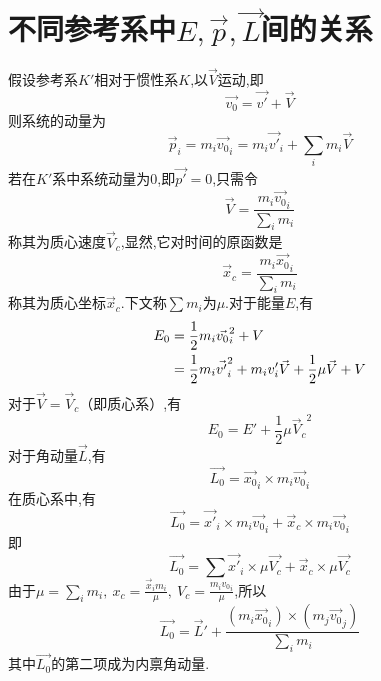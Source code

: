 \section{不同参考系中$E,\vec{p},\vec{L}$间的关系}
假设参考系$K'$相对于惯性系$K$,以$\vec{V}$运动,即
\begin{equation}
\vec{v_0} = \vec{v'} + \vec{V}
\end{equation}
则系统的动量为
\begin{equation}
\vec{p}_i = m_i \vec{v_0}_i = m_i\vec{v'}_i + \sum_{i}m_i\vec{V}
\end{equation}
若在$K'$系中系统动量为0,即$\vec{p'}=0$,只需令
\begin{equation}
\vec{V} = \frac{m_i\vec{v_0}_i}{\sum_{i}m_i}
\end{equation}
称其为质心速度$\vec{V}_c$,显然,它对时间的原函数是
\begin{equation}
\vec{x}_c = \frac{m_i\vec{x_0}_i}{\sum_{i}m_i}
\end{equation}
称其为质心坐标$\vec{x}_c$.下文称$\sum m_i$为$\mu$.对于能量$E$,有
\begin{align}
E_0 = {} & \frac{1}{2}m_i{\vec{v_0}_i}^2 + V \notag \\
= {} & \frac{1}{2}m_i{\vec{v'}_i}^2 + m_i v'_i \vec{V} + \frac{1}{2}\mu\vec{V} + V
\end{align}
对于$\vec{V} = \vec{V}_c$（即质心系）,有
\begin{equation}
E_0 = E' + \frac{1}{2}\mu{\vec{V}_c}^2
\end{equation}
对于角动量$\vec{L}$,有
\begin{equation}
\vec{L_0} = \vec{x_0}_i \times m_i \vec{v_0}_i
\end{equation}
在质心系中,有
\begin{equation}
\vec{L_0} = \vec{x'}_i \times m_i \vec{v_0}_i + \vec{x}_c \times m_i \vec{v_0}_i
\end{equation}
即
\begin{equation}
\vec{L_0} = \sum\vec{x'}_i \times \mu\vec{V_c} + \vec{x}_c \times \mu\vec{V_c}
\end{equation}
由于$\mu=\sum_{i}m_i,\ x_c=\frac{\vec{x}_i m_i}{\mu},\ V_c=\frac{m_i {v_0}_i}{\mu}$,所以
\begin{equation}
\vec{L_0} = \vec{L}' + \frac{(m_i \vec{x_0}_i)\times (m_j \vec{v_0}_j)}{\sum_{i}m_i}
\end{equation}
其中$\vec{L_0}$的第二项成为内禀角动量.

